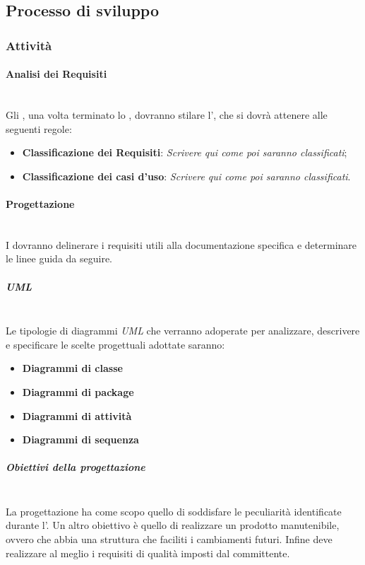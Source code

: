 \subsection{Processo di sviluppo}
\subsubsection{Attività}
\paragraph{Analisi dei Requisiti}
	~\\Gli \anas, una volta terminato lo \SdF, dovranno stilare l'\AdR, che si dovrà attenere alle seguenti regole:
	\begin{itemize}
	\item \textbf{Classificazione dei Requisiti}:
	\textit{Scrivere qui come poi saranno classificati};
	\item \textbf{Classificazione dei casi d'uso}:
	\textit{Scrivere qui come poi saranno classificati}.
	\end{itemize}
\paragraph{Progettazione}
	~\\I \progs{} dovranno delinerare i requisiti utili alla documentazione specifica e determinare le linee guida da seguire.
	\subparagraph{UML}
	~\\Le tipologie di diagrammi \emph{UML} che verranno adoperate per analizzare, descrivere e specificare le scelte progettuali adottate saranno:
	\begin{itemize}
		\item \textbf{Diagrammi di classe}
		\item \textbf{Diagrammi di package}
		\item \textbf{Diagrammi di attività}
		\item \textbf{Diagrammi di sequenza}
	\end{itemize}
	
	\subparagraph{Obiettivi della progettazione}
	~\\La progettazione ha come scopo quello di soddisfare le peculiarità identificate durante l'\AdR. Un altro obiettivo è quello di realizzare un prodotto manutenibile, ovvero che abbia una struttura che faciliti i cambiamenti futuri.
	\newline Infine deve realizzare al meglio i requisiti di qualità imposti dal committente.
